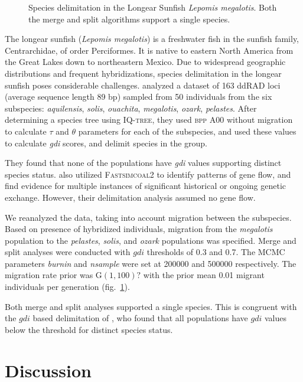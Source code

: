 \documentclass[A4]{article1}
\newcommand{\red}[1]{{\color{red}{#1}}}
\begin{document}
\begin{figure}[t]
    \caption{Species delimitation in the Longear Sunfish \textit{Lepomis megalotis}.
        Both the merge and split algorithms support a single species. %
    } \label{fig:longear-fish}
\end{figure}

The longear sunfish (\textit{Lepomis megalotis}) is a freshwater fish in the sunfish
family, Centrarchidae, of order Perciformes.  It is native to eastern North America from
the Great Lakes down to northeastern Mexico.  Due to widespread geographic distributions
and frequent hybridizations, species delimitation in the longear sunfish poses
considerable challenges. \citet{Kim2022} analyzed a dataset of 163 ddRAD loci (average
sequence length 89 bp) sampled from 50 individuals from the six subspecies:
\textit{aquilensis}, \textit{solis}, \textit{ouachita}, \textit{megalotis},
\textit{ozark}, \textit{pelastes}.  After determining a species tree using
\textsc{IQ-tree}, they used \textsc{bpp} A00 without migration to calculate $\tau$ and
$\theta$ parameters for each of the subspecies, and used these values to calculate
\textit{gdi} scores, and delimit species in the group.

They found that none of the populations have \textit{gdi} values supporting distinct
species status.  \citet{Kim2022} also utilized \textsc{Fastsimcoal2} to identify patterns
of gene flow, and find evidence for multiple instances of significant historical or
ongoing genetic exchange.  However, their delimitation analysis assumed no gene flow.

We reanalyzed the data, taking into account migration between the subspecies.  Based on
presence of hybridized individuals, migration from the \textit{megalotis} population to
the \textit{pelastes}, \textit{solis}, and \textit{ozark} populations was specified. Merge
and split analyses were conducted with $gdi$ thresholds of 0.3 and 0.7.  The MCMC
parameters \textit{burnin} and \textit{nsample} were set at 200000 and 500000
respectively.  The migration rate prior was G$(1,100)?$  with the prior mean 0.01 migrant
individuals per generation (fig.~\ref{fig:longear-fish}). \red{[Move details to SI.]}

Both merge and split analyses supported a single species.  This is congruent with the $gdi$
based delimitation of \citet{Kim2022}, who found that all populations have $gdi$ values
below the threshold for distinct species status.



\section{Discussion}
\end{document}
